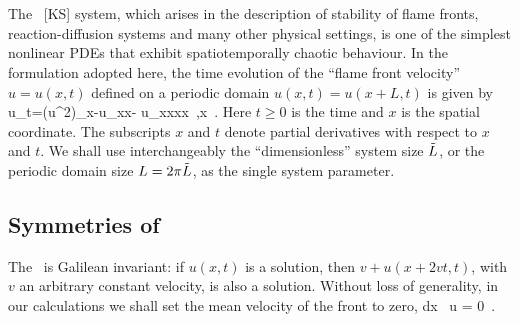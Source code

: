 

\section{\KSe}
\label{s-KS}


The \KS\ [KS] system, which
arises in the description of stability of
flame fronts, reaction-diffusion systems and many other physical settings,
is one of the simplest nonlinear PDEs that
exhibit spatiotemporally chaotic behaviour.
In the formulation adopted here, the time evolution of the 
``flame front velocity'' $u=u(x,t)$ defined on a periodic domain
$u(x,t) = u(x+L,t)$
is given by
\beq
    u_t=(u^2)_x-u_{xx}- u_{xxxx}
    \,,\qquad   x \in [0,2\pi \tildeL]
    \,.
Here $t \geq 0$ is the time and
$x$ is the spatial coordinate.
The subscripts $x$ and $t$ denote partial derivatives with respect to
$x$ and $t$. We shall use interchangeably the ``dimensionless''
system size $\tilde{L}$, or the periodic domain size $L= 2\pi \tilde{L}$,
as the single system parameter.


\subsection{Symmetries of \KSe}

The  \KSe\ is
Galilean invariant: if $u(x,t)$ is a solution, then 
$v+u(x+2vt,t)$, with $v$ an arbitrary constant velocity, is also a solution. 
Without loss of generality, in our calculations we shall set 
the mean velocity of the  front to zero,
\beq
\int dx \, u = 0
\,.

